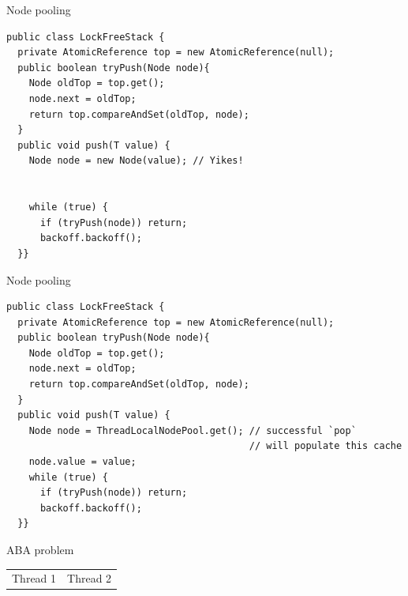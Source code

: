 \begin{frame}[fragile]{Node pooling}

\begin{verbatim}
public class LockFreeStack {
  private AtomicReference top = new AtomicReference(null); 
  public boolean tryPush(Node node){
    Node oldTop = top.get();    
    node.next = oldTop;
    return top.compareAndSet(oldTop, node);
  }
  public void push(T value) {
    Node node = new Node(value); // Yikes!


    while (true) {
      if (tryPush(node)) return;
      backoff.backoff();
  }}
\end{verbatim}

\end{frame}


\begin{frame}{Node pooling}

\begin{verbatim}
public class LockFreeStack {
  private AtomicReference top = new AtomicReference(null); 
  public boolean tryPush(Node node){
    Node oldTop = top.get();    
    node.next = oldTop;
    return top.compareAndSet(oldTop, node);
  }
  public void push(T value) {
    Node node = ThreadLocalNodePool.get(); // successful `pop` 
                                           // will populate this cache
    node.value = value;
    while (true) {
      if (tryPush(node)) return;
      backoff.backoff();
  }}
\end{verbatim}
\end{frame}


\begin{frame}[t,fragile]{ABA problem}
\begin{center}
\end{center} 

\begin{tabular}{p{5cm}p{5cm}}
Thread 1 & Thread 2 \\
\end{tabular}
\end{frame}



